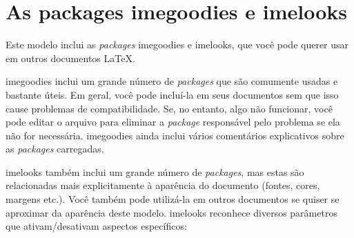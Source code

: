 
\newcommand{\pkg}[1]{\textsf{#1}}
\newcommand{\cmd}[1]{\textsf{#1}}
\newcommand{\sla}{\textbackslash}
\newcommand{\ltxcmd}[1]{\cmd{\sla{}#1}}
\chapter{As packages \pkg{imegoodies} e \pkg{imelooks}}
\label{ann:imegoodlooks}

Este modelo inclui as \textit{packages} \pkg{imegoodies} e \pkg{imelooks},
que você pode querer usar em outros documentos \LaTeX.

\pkg{imegoodies} inclui um grande número de \textit{packages} que são
comumente usadas e bastante úteis. Em geral, você pode incluí-la em seus
documentos sem que isso cause problemas de compatibilidade. Se, no
entanto, algo não funcionar, você pode editar o arquivo para eliminar
a \textit{package} responsável pelo problema se ela não for necessária.
\pkg{imegoodies} ainda inclui vários comentários explicativos sobre as
\textit{packages} carregadas.

\pkg{imelooks} também inclui um grande número de \textit{packages}, mas
estas são relacionadas mais explicitamente à aparência do documento
(fontes, cores, margens etc.). Você também pode utilizá-la em outros
documentos se quiser se aproximar da aparência deste modelo. \pkg{imelooks}
reconhece diversos parâmetros que ativam/desativam aspectos específicos:

